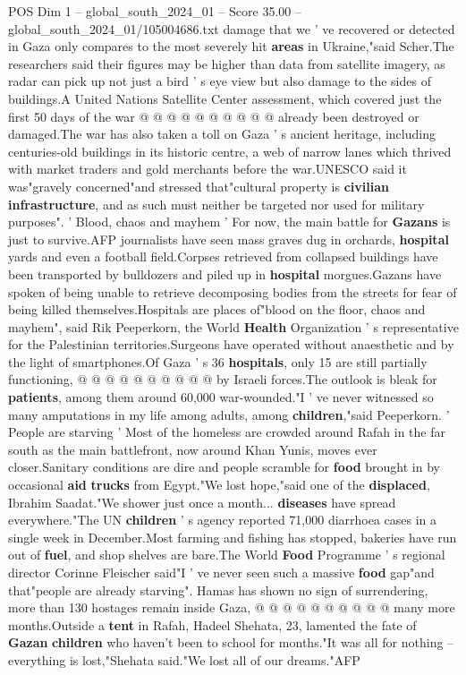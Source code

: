 \begin{textsample}{POS Dim 1 – global\_south\_2024\_01 – Score 35.00 – global\_south\_2024\_01/105004686.txt}
damage that we ' ve recovered or detected in Gaza only compares to the most severely hit \textbf{areas} in Ukraine,"said Scher.The researchers said their figures may be higher than data from satellite imagery, as radar can pick up not just a bird ' s eye view but also damage to the sides of buildings.A United Nations Satellite Center assessment, which covered just the first 50 days of the war @ @ @ @ @ @ @ @ @ @ already been destroyed or damaged.The war has also taken a toll on Gaza ' s ancient heritage, including centuries-old buildings in its historic centre, a web of narrow lanes which thrived with market traders and gold merchants before the war.UNESCO said it was"gravely concerned"and stressed that"cultural property is \textbf{civilian} \textbf{infrastructure}, and as such must neither be targeted nor used for military purposes". ' Blood, chaos and mayhem ' For now, the main battle for \textbf{Gazans} is just to survive.AFP journalists have seen mass graves dug in orchards, \textbf{hospital} yards and even a football field.Corpses retrieved from collapsed buildings have been transported by bulldozers and piled up in \textbf{hospital} morgues.Gazans have spoken of being unable to retrieve decomposing bodies from the streets for fear of being killed themselves.Hospitals are places of"blood on the floor, chaos and mayhem", said Rik Peeperkorn, the World \textbf{Health} Organization ' s representative for the Palestinian territories.Surgeons have operated without anaesthetic and by the light of smartphones.Of Gaza ' s 36 \textbf{hospitals}, only 15 are still partially functioning, @ @ @ @ @ @ @ @ @ @ by Israeli forces.The outlook is bleak for \textbf{patients}, among them around 60,000 war-wounded."I ' ve never witnessed so many amputations in my life among adults, among \textbf{children},"said Peeperkorn. ' People are starving ' Most of the homeless are crowded around Rafah in the far south as the main battlefront, now around Khan Yunis, moves ever closer.Sanitary conditions are dire and people scramble for \textbf{food} brought in by occasional \textbf{aid} \textbf{trucks} from Egypt."We lost hope,"said one of the \textbf{displaced}, Ibrahim Saadat."We shower just once a month... \textbf{diseases} have spread everywhere."The UN \textbf{children} ' s agency reported 71,000 diarrhoea cases in a single week in December.Most farming and fishing has stopped, bakeries have run out of \textbf{fuel}, and shop shelves are bare.The World \textbf{Food} Programme ' s regional director Corinne Fleischer said"I ' ve never seen such a massive \textbf{food} gap"and that"people are already starving".
Hamas has shown no sign of surrendering, more than 130 hostages remain inside Gaza, @ @ @ @ @ @ @ @ @ @ many more months.Outside a \textbf{tent} in Rafah, Hadeel Shehata, 23, lamented the fate of \textbf{Gazan} \textbf{children} who haven't been to school for months."It was all for nothing -- everything is lost,"Shehata said."We lost all of our dreams."AFP


\end{textsample}
